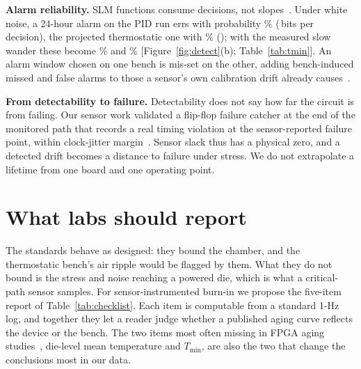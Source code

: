 \documentclass[10pt,twocolumn]{article}
\newcommand{\Tmin}{T_{\min}}
\begin{document}
\textbf{Alarm reliability.} SLM functions consume decisions, not slopes~\cite{kashyap}. Under white noise, a 24-hour alarm on the PID run errs with probability \vPerrPidBound\% (\vCpidBound\,bits per decision), the projected thermostatic one with \vPerrBbBound\% (\vCbbBound); with the measured slow wander these become \vPerrPidLrv\% and \vPerrBbLrv\% [Figure~\ref{fig:detect}(b); Table~\ref{tab:tmin}]. An alarm window chosen on one bench is mis-set on the other, adding bench-induced missed and false alarms to those a sensor's own calibration drift already causes~\cite{anik}.

\textbf{From detectability to failure.} Detectability does not say how far the circuit is from failing. Our sensor work validated a flip-flop failure catcher at the end of the monitored path that records a real timing violation at the sensor-reported failure point, within clock-jitter margin~\cite{sbcci25}. Sensor slack thus has a physical zero, and a detected drift becomes a distance to failure under stress. We do not extrapolate a lifetime from one board and one operating point.

\section{What labs should report}

The standards behave as designed: they bound the chamber, and the thermostatic bench's air ripple would be flagged by them. What they do not bound is the stress and noise reaching a powered die, which is what a critical-path sensor samples. For sensor-instrumented burn-in we propose the five-item report of Table~\ref{tab:checklist}. Each item is computable from a standard 1-Hz log, and together they let a reader judge whether a published aging curve reflects the device or the bench. The two items most often missing in FPGA aging studies~\cite{valdes,sobas}, die-level mean temperature and $\Tmin$, are also the two that change the conclusions most in our data.
\end{document}
